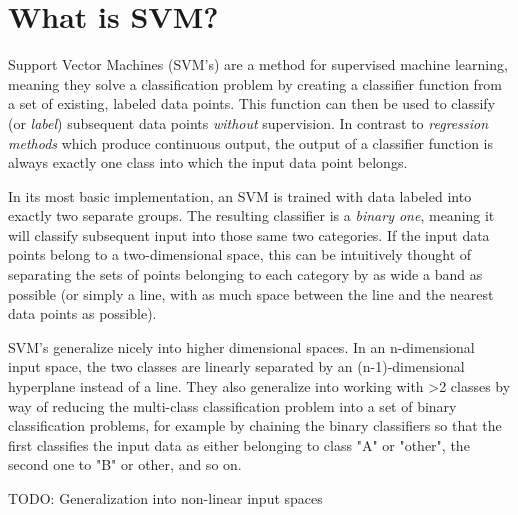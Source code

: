 \documentclass{netsec2012}
\begin{document}
\section{What is SVM?}

Support Vector Machines (SVM's) are a method for supervised machine learning, meaning they solve a
classification problem by creating a classifier function from a set of existing, labeled data
points.  This function can then be used to classify (or \emph{label}) subsequent data points
\emph{without} supervision.  In contrast to \emph{regression methods} which produce continuous
output, the output of a classifier function is always exactly one class into which the input data
point belongs.

In its most basic implementation, an SVM is trained with data labeled into exactly two separate
groups.  The resulting classifier is a \emph{binary one}, meaning it will classify subsequent input
into those same two categories.  If the input data points belong to a two-dimensional space, this
can be intuitively thought of separating the sets of points belonging to each category by as wide a
band as possible (or simply a line, with as much space between the line and the nearest data points
as possible).

SVM's generalize nicely into higher dimensional spaces.  In an n-dimensional input space, the two
classes are linearly separated by an (n-1)-dimensional hyperplane instead of a line.  They also
generalize into working with >2 classes by way of reducing the multi-class classification problem
into a set of binary classification problems, for example by chaining the binary classifiers so that
the first classifies the input data as either belonging to class "A" or "other", the second one to
"B" or other, and so on.

TODO: Generalization into non-linear input spaces

%
%
%
\end{document}

